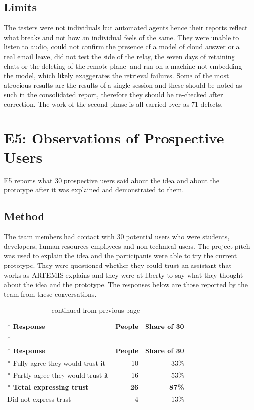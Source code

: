 \documentclass{FastFyp}
\begin{document}
\subsection{Limits}
The testers were not individuals but automated agents hence their reports reflect what breaks and not how an individual feels of the same. They were unable to listen to audio, could not confirm the presence of a model of cloud answer or a real email leave, did not test the side of the relay, the seven days of retaining chats or the deleting of the remote plane, and ran on a machine not embedding the model, which likely exaggerates the retrieval failures. Some of the most atrocious results are the results of a single session and these should be noted as such in the consolidated report, therefore they should be re-checked after correction. The work of the second phase is all carried over as 71 defects.


\section{E5: Observations of Prospective Users}
E5 reports what 30 prospective users said about the idea and about the prototype after it was explained and demonstrated to them.

\subsection{Method}
The team members had contact with 30 potential users who were students, developers, human resources employees and non-technical users. The project pitch was used to explain the idea and the participants were able to try the current prototype. They were questioned whether they could trust an assistant that works as ARTEMIS explains and they were at liberty to say what they thought about the idea and the prototype. The responses below are those reported by the team from these conversations.


{
\begin{longtable}{|p{6.4cm}|r|r|}
\caption{Stated trust, 30 prospective users.}\label{tab:obs}\\*
\hline
\textbf{Response} & \textbf{People} & \textbf{Share of 30} \\*
\hline
\endfirsthead
\caption[]{continued from previous page}\\*
\hline
\textbf{Response} & \textbf{People} & \textbf{Share of 30} \\*
\hline
\endhead
\hline
Fully agree they would trust it & 10 & 33\% \\*
\hline
Partly agree they would trust it & 16 & 53\% \\*
\hline
\textbf{Total expressing trust} & \textbf{26} & \textbf{87\%} \\
\hline
Did not express trust & 4 & 13\% \\
\hline
\end{longtable}
}
\end{document}
